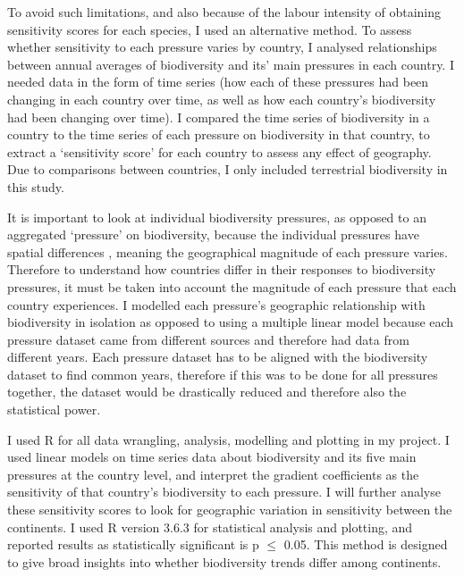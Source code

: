 \documentclass[11pt, a4paper, titlepage]{article}
\begin{document}
	 To avoid such limitations, and also because of the labour intensity of obtaining sensitivity scores for each species, I used an alternative method. To assess whether sensitivity to each pressure varies by country, I analysed relationships between annual averages of biodiversity and its' main pressures in each country. I needed data in the form of time series (how each of these pressures had been changing in each country over time, as well as how each country's biodiversity had been changing over time). I compared the time series of biodiversity in a country to the time series of each pressure on biodiversity in that country, to extract a `sensitivity score' for each country to assess any effect of geography. Due to comparisons between countries, I only included terrestrial biodiversity in this study. 	 %


	It is important to look at individual biodiversity pressures, as opposed to an aggregated `pressure' on biodiversity, because the individual pressures have spatial differences \citep{steffen2015planetary}, meaning the geographical magnitude of each pressure varies. Therefore to understand how countries differ in their responses to biodiversity pressures, it must be taken into account the magnitude of each pressure that each country experiences. I modelled each pressure's geographic relationship with biodiversity in isolation as opposed to using a multiple linear model because each pressure dataset came from different sources and therefore had data from different years. Each pressure dataset has to be aligned with the biodiversity dataset to find common years, therefore if this was to be done for all pressures together, the dataset would be drastically reduced and therefore also the statistical power.
	
	I used R for all data wrangling, analysis, modelling and plotting in my project. I used linear models on time series data about biodiversity and its five main pressures at the country level, and interpret the gradient coefficients as the sensitivity of that country's biodiversity to each pressure. I will further analyse these sensitivity scores to look for geographic variation in sensitivity between the continents. I used R version 3.6.3 for statistical analysis and plotting, and reported results as statistically significant is p $\leq$ 0.05. This method is designed to give broad insights into whether biodiversity trends differ among continents. \newline
\end{document}
